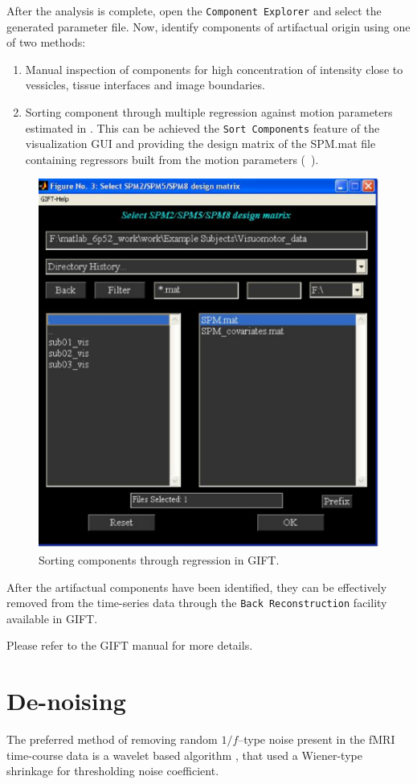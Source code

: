 After the analysis is complete, open the \verb"Component Explorer"
and select the generated parameter file. Now, identify components of
artifactual origin using one of two methods:

\begin{enumerate}[a]
  \item Manual inspection of components for high concentration of
  intensity close to vessicles, tissue interfaces and image
  boundaries.
  \item Sorting component through multiple regression against motion
  parameters estimated in . This can be
  achieved the \verb"Sort Components" feature of the visualization
  GUI and providing the design matrix of the SPM.mat file containing
  regressors built from the motion parameters (\cf~).
\end{enumerate}

\begin{figure}
    \begin{center}
   \includegraphics[width=.37\linewidth]{figures/gift-regress}
    \caption{Sorting components through regression in GIFT.
     \label{fig:gift-regress}}
    \end{center}
\end{figure}

After the artifactual components have been identified, they can be
effectively removed from the time-series data through the \verb"Back Reconstruction"
facility available in GIFT.

Please refer to the GIFT manual for more details.

\section{De-noising}

The preferred method of removing random $1/f$--type noise present in the fMRI time-course data
is a wavelet based algorithm \cite{Alexander2000}, that used a Wiener-type shrinkage for thresholding
noise coefficient.

